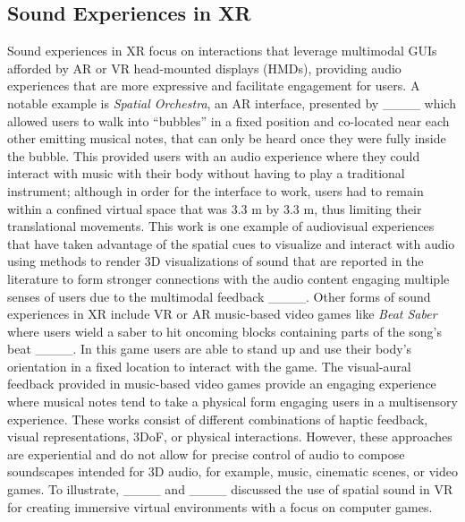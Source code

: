 \subsection{Sound Experiences in XR}
Sound experiences in XR focus on interactions that leverage multimodal GUIs afforded by AR or VR head-mounted displays (HMDs), providing audio experiences that are more expressive and facilitate engagement for users. A notable example is \emph{Spatial Orchestra}, an AR interface, presented by ____ which allowed users to walk into \enquote{bubbles} in a fixed position and co-located near each other emitting musical notes, that can only be heard once they were fully inside the bubble. This provided users with an audio experience where they could interact with music with their body without having to play a traditional instrument; although in order for the interface to work, users had to remain within a confined virtual space that was 3.3 m by 3.3 m, thus limiting their translational movements. This work is one example of audiovisual experiences that have taken advantage of the spatial cues to visualize and interact with audio using methods to render 3D visualizations of sound that are reported in the literature to form stronger connections with the audio content engaging multiple senses of users due to the multimodal feedback ____. Other forms of sound experiences in XR include VR or AR music-based video games like \emph{Beat Saber} where users wield a saber to hit oncoming blocks containing parts of the song's beat ____. In this game users are able to stand up and use their body's orientation in a fixed location to interact with the game. The visual-aural feedback provided in music-based video games provide an engaging experience where musical notes tend to take a physical form engaging users in a multisensory experience. These works consist of different combinations of haptic feedback, visual representations, 3DoF, or physical interactions.  However, these approaches are experiential and do not allow for precise control of audio to compose soundscapes intended for 3D audio, for example, music, cinematic scenes, or video games. To illustrate, ____ and ____ discussed the use of spatial sound in VR for creating immersive virtual environments with a focus on computer games.

